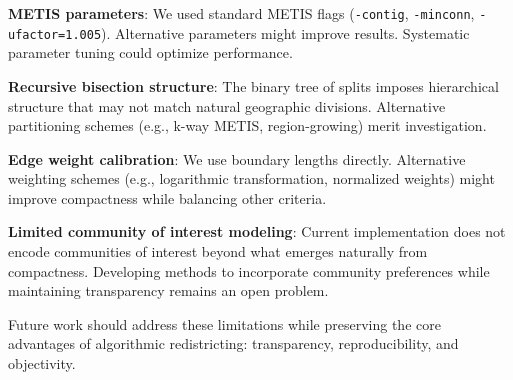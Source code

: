 \textbf{METIS parameters}: We used standard METIS flags (\texttt{-contig}, \texttt{-minconn}, \texttt{-ufactor=1.005}). Alternative parameters might improve results. Systematic parameter tuning could optimize performance.

\textbf{Recursive bisection structure}: The binary tree of splits imposes hierarchical structure that may not match natural geographic divisions. Alternative partitioning schemes (e.g., k-way METIS, region-growing) merit investigation.

\textbf{Edge weight calibration}: We use boundary lengths directly. Alternative weighting schemes (e.g., logarithmic transformation, normalized weights) might improve compactness while balancing other criteria.

\textbf{Limited community of interest modeling}: Current implementation does not encode communities of interest beyond what emerges naturally from compactness. Developing methods to incorporate community preferences while maintaining transparency remains an open problem.

Future work should address these limitations while preserving the core advantages of algorithmic redistricting: transparency, reproducibility, and objectivity.
